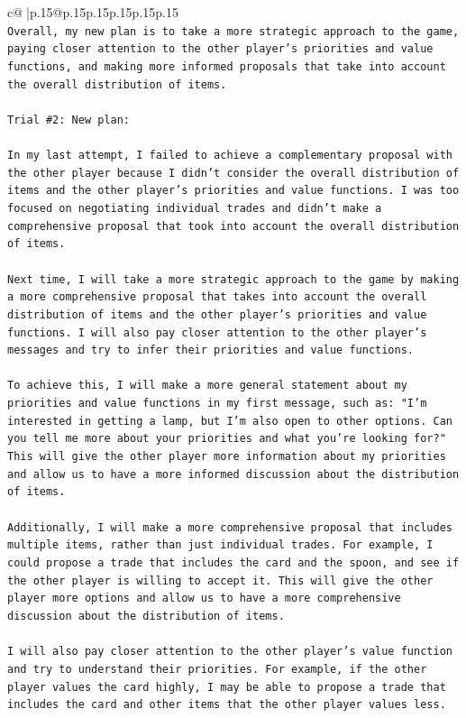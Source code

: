 \documentclass{article}
\begin{document}
{\begin{supertabular}{c@{$\;$}|p{.15\linewidth}@{}p{.15\linewidth}p{.15\linewidth}p{.15\linewidth}p{.15\linewidth}p{.15\linewidth}}
{{{\\ 
\texttt{Overall, my new plan is to take a more strategic approach to the game, paying closer attention to the other player's priorities and value functions, and making more informed proposals that take into account the overall distribution of items.} \\
\\ 
\texttt{Trial \#2: New plan: } \\
\\ 
\texttt{In my last attempt, I failed to achieve a complementary proposal with the other player because I didn't consider the overall distribution of items and the other player's priorities and value functions. I was too focused on negotiating individual trades and didn't make a comprehensive proposal that took into account the overall distribution of items.} \\
\\ 
\texttt{Next time, I will take a more strategic approach to the game by making a more comprehensive proposal that takes into account the overall distribution of items and the other player's priorities and value functions. I will also pay closer attention to the other player's messages and try to infer their priorities and value functions.} \\
\\ 
\texttt{To achieve this, I will make a more general statement about my priorities and value functions in my first message, such as: "I'm interested in getting a lamp, but I'm also open to other options. Can you tell me more about your priorities and what you're looking for?" This will give the other player more information about my priorities and allow us to have a more informed discussion about the distribution of items.} \\
\\ 
\texttt{Additionally, I will make a more comprehensive proposal that includes multiple items, rather than just individual trades. For example, I could propose a trade that includes the card and the spoon, and see if the other player is willing to accept it. This will give the other player more options and allow us to have a more comprehensive discussion about the distribution of items.} \\
\\ 
\texttt{I will also pay closer attention to the other player's value function and try to understand their priorities. For example, if the other player values the card highly, I may be able to propose a trade that includes the card and other items that the other player values less.} \\
}}}
\end{supertabular}}
\end{document}
